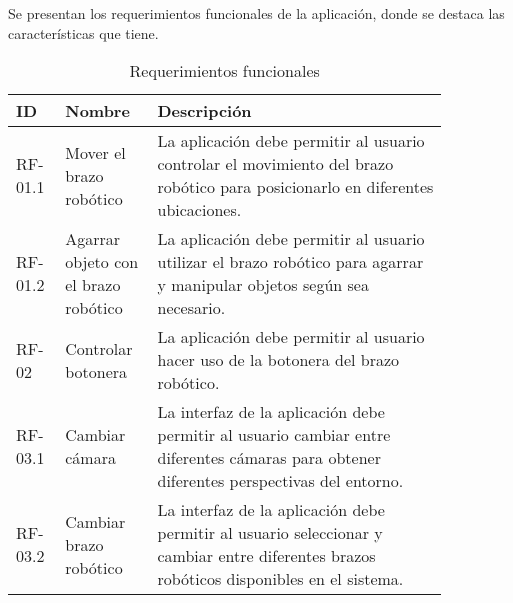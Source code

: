Se presentan los requerimientos funcionales de la aplicación, donde se destaca las características que tiene.

\begin{table}[h!]
\centering
\begin{tabular}{ |>{\raggedright\arraybackslash}m{0.09\linewidth} |>{\raggedright\arraybackslash}m{0.17\linewidth} |>{\raggedright\arraybackslash}m{0.6\linewidth} | }
\hline
ID & Nombre & Descripción \\
\hline
RF-01.1 & Mover el brazo robótico & La aplicación debe permitir al usuario controlar el movimiento del brazo robótico para posicionarlo en diferentes ubicaciones. \\
\hline
RF-01.2 & Agarrar objeto con el brazo robótico & La aplicación debe permitir al usuario utilizar el brazo robótico para agarrar y manipular objetos según sea necesario. \\
\hline
RF-02 & Controlar botonera & La aplicación debe permitir al usuario hacer uso de la botonera del brazo robótico. \\
\hline
RF-03.1 & Cambiar cámara & La interfaz de la aplicación debe permitir al usuario cambiar entre diferentes cámaras para obtener diferentes perspectivas del entorno. \\
\hline
RF-03.2 & Cambiar brazo robótico & La interfaz de la aplicación debe permitir al usuario seleccionar y cambiar entre diferentes brazos robóticos disponibles en el sistema. \\
\hline
\end{tabular}
\caption{Requerimientos funcionales}
\end{table}